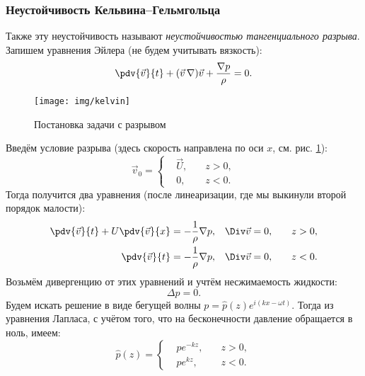 \subsubsection{Неустойчивость Кельвина\hspace{0.5pt}--Гельмгольца}
Также эту неустойчивость называют \textit{неустойчивостью тангенциального разрыва}. Запишем уравнения Эйлера (не будем учитывать вязкость):
\begin{equation}
    \pdv{\vec{v}}{t}+ (\vec{v}\,\nabla) \vec{v} +
        \frac{\nabla p}{\rho}=0.
\end{equation}
\begin{figure}[H]
    \centering
    \texttt{[image: img/kelvin]}
    \caption{Постановка задачи с разрывом}
    \label{fig:kelv-gelm}
\end{figure}
Введём условие разрыва (здесь скорость направлена по оси $x$, см. рис. \ref{fig:kelv-gelm}):
\begin{equation}
    \vec{v}_0 = \left\{
    \begin{aligned}
        &\vec{U}, \quad &z>0, \\
        &0, \quad &z<0.
    \end{aligned}\right.
\end{equation}
Тогда получится два уравнения (после линеаризации,
где мы выкинули второй порядок малости):
\begin{gather}
    \begin{aligned}
     \pdv{\vec{v}}{t}+U\pdv{\vec{v}}{x} = -\frac{1}{\rho}\nabla p,
     &\quad \Div \vec{v} = 0, &\quad z>0,\\
    \pdv{\vec{v}}{t} = -\frac{1}{\rho}\nabla p,
                             &\quad \Div \vec{v} = 0, &\quad z<0.\\
    \end{aligned}
\end{gather}
Возьмём дивергенцию от этих уравнений и учтём несжимаемость жидкости:
\begin{equation}
    \Delta p = 0.
\end{equation}
Будем искать решение в виде бегущей волны $p=\hat{p}(z)e^{i(kx-\omega t)}$. Тогда из уравнения Лапласа, с учётом того, что на бесконечности  давление обращается в ноль, имеем:
\begin{equation}
    \hat{p}(z) = \left\{
    \begin{aligned}
        &p e^{-kz}, \quad &z>0,\\
        &p e^{kz}, \quad & z<0.
    \end{aligned}
    \right.
\end{equation}
